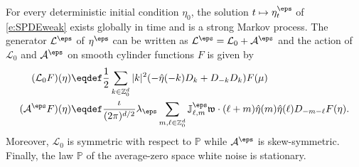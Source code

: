 \documentclass[reqno,11pt]{preprint}
\renewcommand{\Z}{\mathbb{Z}}
\newcommand{\J}{\mathbb{J}}
\newcommand{\cA}{\mathcal{A}}
\newcommand{\cL}{\mathcal{L}}
\newcommand{\fw}{\mathfrak{w}}
\newcommand{\1}{\mathds{1}}
\def\indN#1{{	\J^\eps_{#1}	}}
\newcommand{\gen}{\cL^\eps}
\newcommand{\gensy}{\cL_0}
\newcommand{\gena}{\cA^{\eps}}
\begin{document}
\begin{lemma}
\label{lem:generalproperties}
For every deterministic initial condition $\eta_0$, the solution $t\mapsto \eta^\eps_t$ 
of \eqref{e:SPDEweak} exists globally in time and is a strong Markov process. 
The generator $\gen$ of $\eta^\eps$ can be written as
$\gen=\gensy+\gena$ and the action of $\gensy$ and $\gena$ on smooth cylinder functions $F$
is given by 
 \begin{align}
 (\gensy F)(\eta) &\eqdef \frac{1}{2} \sum_{k \in \Z^d_0} |k|^2 (-\hat\eta(-k) D_k  +  D_{-k}D_k )F(\mu) \label{e:gens}\\
   (\gena F)(\eta) &\eqdef \frac\iota{(2
    \pi)^{d/2}}\lambda_\eps \sum_{m,\ell \in \Z_0^d} \indN{\ell,m} \fw\cdot (\ell+m) \hat \eta(m) \hat \eta(\ell) D_{-m-\ell} F(\eta). \label{e:gena}
 \end{align}
 Moreover, $\gensy$ is symmetric with respect to $\mathbb P$ while $\gena$ is skew-symmetric.
Finally, the law $\mathbb P$ of the average-zero space white noise is stationary.
\end{lemma}
\end{document}
